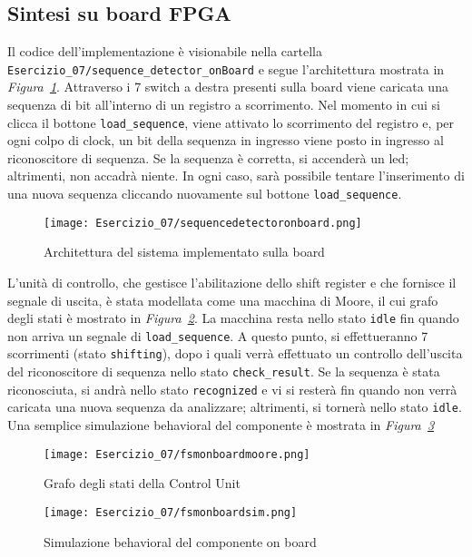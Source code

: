 \subsection{Sintesi su board FPGA}
Il codice dell'implementazione è visionabile nella cartella \lstinline{Esercizio_07/sequence_detector_onBoard} e segue l'architettura mostrata in \textit{Figura~\ref{fig:fsmonboard}}. Attraverso i 7 switch a destra presenti sulla board viene caricata una sequenza di bit all'interno di un registro a scorrimento. Nel momento in cui si clicca il bottone \lstinline{load_sequence}, viene attivato lo scorrimento del registro e, per ogni colpo di clock, un bit della sequenza in ingresso viene posto in ingresso al riconoscitore di sequenza. Se la sequenza è corretta, si accenderà un led; altrimenti, non accadrà niente. In ogni caso, sarà possibile tentare l'inserimento di una nuova sequenza cliccando nuovamente sul bottone \lstinline{load_sequence}.

\begin{figure}[h]
\begin{centering}
\texttt{[image: Esercizio\_07/sequencedetectoronboard.png]}
\par\end{centering}
\caption{\label{fig:fsmonboard}Architettura del sistema implementato sulla board}
\end{figure}

L'unità di controllo, che gestisce l'abilitazione dello shift register e che fornisce il segnale di uscita, è stata modellata come una macchina di Moore, il cui grafo degli stati è mostrato in \textit{Figura~\ref{fig:fsmonboardmoore}}. La macchina resta nello stato \lstinline{idle} fin quando non arriva un segnale di \lstinline{load_sequence}. A questo punto, si effettueranno 7 scorrimenti (stato \lstinline{shifting}), dopo i quali verrà effettuato un controllo dell'uscita del riconoscitore di sequenza nello stato \lstinline{check_result}. Se la sequenza è stata riconosciuta, si andrà nello stato \lstinline{recognized} e vi si resterà fin quando non verrà caricata una nuova sequenza da analizzare; altrimenti, si tornerà nello stato \lstinline{idle}. Una semplice simulazione behavioral del componente è mostrata in \textit{Figura~\ref{fig:fsmonboardsim}}

\begin{figure}[h]
\begin{centering}
\texttt{[image: Esercizio\_07/fsmonboardmoore.png]}
\par\end{centering}
\caption{\label{fig:fsmonboardmoore}Grafo degli stati della Control Unit}
\end{figure}

\begin{figure}[h]
\begin{centering}
\texttt{[image: Esercizio\_07/fsmonboardsim.png]}
\par\end{centering}
\caption{\label{fig:fsmonboardsim}Simulazione behavioral del componente on board}
\end{figure}